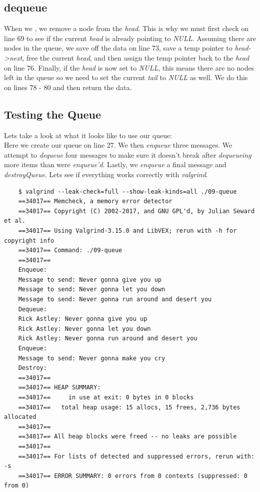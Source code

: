 \documentclass[../main.tex]{subfiles}
\begin{document}
	\subsection{dequeue}
	When we , we remove a node from the \textit{head}.  This is why we must first check on line 69 to see if the current \textit{head} is already pointing to \textit{NULL}.  Assuming there are nodes in the queue, we save off the data on line 73, save a temp pointer to \textit{head->next}, free the current \textit{head}, and then assign the temp pointer back to the \textit{head} on line 76.  Finally, if the \textit{head} is now set to \textit{NULL}, this means there are no nodes left in the queue so we need to set the current \textit{tail} to \textit{NULL} as well.  We do this on lines 78 - 80 and then return the data.
	
	\subsection{Testing the Queue}
	Lets take a look at what it looks like to use our queue:\\
	
	
	
	Here we create our queue on line 27. We then \textit{enqueue} three messages. We attempt to \textit{dequeue} four messages to make sure it doesn't break after \textit{dequeueing} more items than were \textit{enqueue'd}.  Lastly, we \textit{enqueue} a final message and \textit{destroyQueue}.  Lets see if everything works correctly with \textit{valgrind}.
	
	\begin{verbatim}
	$ valgrind --leak-check=full --show-leak-kinds=all ./09-queue 
	==34017== Memcheck, a memory error detector
	==34017== Copyright (C) 2002-2017, and GNU GPL'd, by Julian Seward et al.
	==34017== Using Valgrind-3.15.0 and LibVEX; rerun with -h for copyright info
	==34017== Command: ./09-queue
	==34017== 
	Enqueue:
	Message to send: Never gonna give you up
	Message to send: Never gonna let you down
	Message to send: Never gonna run around and desert you
	Dequeue:
	Rick Astley: Never gonna give you up
	Rick Astley: Never gonna let you down
	Rick Astley: Never gonna run around and desert you
	Enqueue:
	Message to send: Never gonna make you cry
	Destroy:
	==34017== 
	==34017== HEAP SUMMARY:
	==34017==     in use at exit: 0 bytes in 0 blocks
	==34017==   total heap usage: 15 allocs, 15 frees, 2,736 bytes allocated
	==34017== 
	==34017== All heap blocks were freed -- no leaks are possible
	==34017== 
	==34017== For lists of detected and suppressed errors, rerun with: -s
	==34017== ERROR SUMMARY: 0 errors from 0 contexts (suppressed: 0 from 0)
	\end{verbatim}
	
\end{document}
